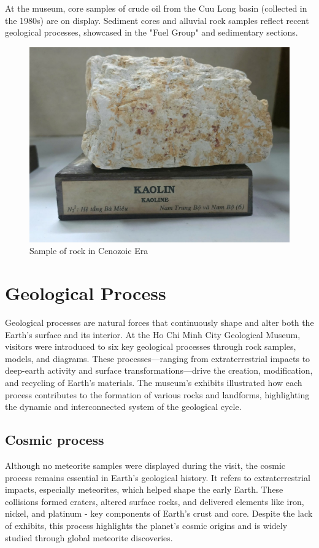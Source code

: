 At the museum, core samples of crude oil from the Cuu Long basin (collected in the 1980s) are on display. Sediment cores and alluvial rock samples reflect recent geological processes, showcased in the "Fuel Group" and sedimentary sections.

\begin{figure}[H]
  \centering
  \includegraphics[max width=0.8\linewidth]{graphics/figure_06.jpg}
  \caption{Sample of rock in Cenozoic Era}
  \label{fig:cenozoic-rock}
\end{figure}

\section{Geological Process}
\label{sec:geological-process}

Geological processes are natural forces that continuously shape and alter both the Earth's surface and its interior. At the Ho Chi Minh City Geological Museum, visitors were introduced to six key geological processes through rock samples, models, and diagrams. These processes—ranging from extraterrestrial impacts to deep-earth activity and surface transformations—drive the creation, modification, and recycling of Earth's materials. The museum's exhibits illustrated how each process contributes to the formation of various rocks and landforms, highlighting the dynamic and interconnected system of the geological cycle.

\subsection{Cosmic process}
\label{subsec:cosmic-process}

Although no meteorite samples were displayed during the visit, the cosmic process remains essential in Earth's geological history. It refers to extraterrestrial impacts, especially meteorites, which helped shape the early Earth. These collisions formed craters, altered surface rocks, and delivered elements like iron, nickel, and platinum - key components of Earth's crust and core. Despite the lack of exhibits, this process highlights the planet's cosmic origins and is widely studied through global meteorite discoveries.

